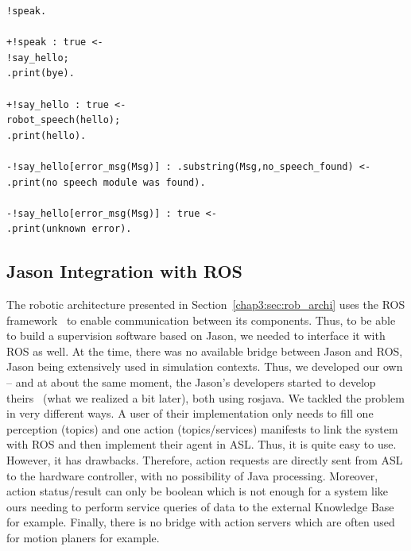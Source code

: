 \documentclass[a4paper,11pt,twoside]{StyleThese}
\begin{document}
\begin{lstlisting}[caption={Example of plan failure handling}, label={chap4:lst:failure}]
!speak.

+!speak : true <- 
!say_hello;
.print(bye).

+!say_hello : true <-
robot_speech(hello);
.print(hello).

-!say_hello[error_msg(Msg)] : .substring(Msg,no_speech_found) <-
.print(no speech module was found).

-!say_hello[error_msg(Msg)] : true <-
.print(unknown error).	
\end{lstlisting} 

\subsection{Jason Integration with ROS}
The robotic architecture presented in Section~\ref{chap3:sec:rob_archi} uses the ROS framework~\cite{quigley_2009_ros} to enable communication between its components. Thus, to be able to build a supervision software based on Jason, we needed to interface it with ROS as well. At the time, there was no available bridge between Jason and ROS, Jason being extensively used in simulation contexts. Thus, we developed our own -- and at about the same moment, the Jason's developers started to develop theirs~\cite{silva_2020_embedded} (what we realized a bit later), both using rosjava. We tackled the problem in very different ways. A user of their implementation only needs to fill one perception (topics) and one action (topics/services) manifests to link the system with ROS and then implement their agent in ASL. Thus, it is quite easy to use. However, it has drawbacks. Therefore, action requests are directly sent from ASL to the hardware controller, with no possibility of Java processing. Moreover, action status/result can only be boolean which is not enough for a system like ours needing to perform service queries of data to the external Knowledge Base for example. Finally, there is no bridge with action servers which are often used for motion planers for example. 
\end{document}

